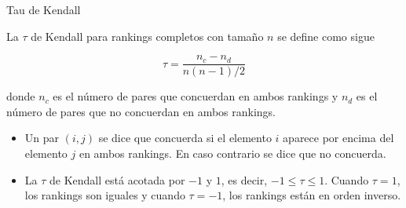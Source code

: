 \documentclass[10pt,hyperref={unicode}]{beamer}
\begin{document}
	\begin{frame}{Tau de Kendall}
		\begin{defi}
			La $\tau$ de Kendall para rankings completos con tamaño $n$ se define como sigue
			
			\begin{equation} \label{def:tau_kendall}
			\tau = \dfrac{n_c - n_d}{n(n-1)/2}
			\end{equation}
			
			donde $n_c$ es el número de pares que concuerdan en ambos rankings y $n_d$ es el número de pares que no concuerdan en ambos rankings.\\
			
			\begin{itemize}
			\item Un par $(i,j)$ se dice que concuerda si el elemento $i$ aparece por encima del elemento $j$ en ambos rankings. En caso contrario se dice que no concuerda.
			
			\item La $\tau$ de Kendall está acotada por $-1$ y $1$, es decir, $-1 \leq \tau \leq 1$. Cuando $\tau = 1$, los rankings son iguales y cuando $\tau = -1$, los rankings están en orden inverso.  
			\end{itemize}
		\end{defi}
	\end{frame}
	
			
			
\end{document}
